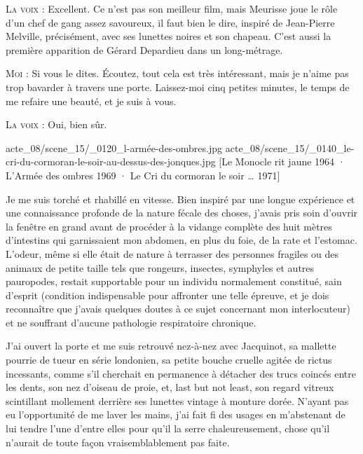 \begin{dialogue}
\textsc{La voix} : Excellent. Ce n’est pas son meilleur film, mais Meurisse joue le rôle d’un chef de gang assez savoureux, il faut bien le dire, inspiré de Jean-Pierre Melville, précisément, avec ses lunettes noires et son chapeau. C’est aussi la première apparition de Gérard Depardieu dans un long-métrage.

\textsc{Moi} : Si vous le dites. Écoutez, tout cela est très intéressant, mais je n’aime pas trop bavarder à travers une porte. Laissez-moi cinq petites minutes, le temps de me refaire une beauté, et je suis à vous.

\textsc{La voix} : Oui, bien sûr.

\end{dialogue}
    
%
%
%
{acte_08/scene_15/_0120_l-armée-des-ombres.jpg}
{acte_08/scene_15/_0140_le-cri-du-cormoran-le-soir-au-dessus-des-jonques.jpg}
[Le Monocle rit jaune \textup{1964} · L'Armée des ombres \textup{1969} · Le Cri du cormoran le soir … \textup{1971}]

Je me suis torché et rhabillé en vitesse. Bien inspiré par une longue expérience et une connaissance profonde de la nature fécale des choses, j’avais pris soin d’ouvrir la fenêtre en grand avant de procéder à la vidange complète des huit mètres d’intestins qui garnissaient mon abdomen, en plus du foie, de la rate et l’estomac. L’odeur, même si elle était de nature à terrasser des personnes fragiles ou des animaux de petite taille tels que rongeurs, insectes, symphyles et autres pauropodes, restait supportable pour un individu normalement constitué, sain d’esprit (condition indispensable pour affronter une telle épreuve, et je dois reconnaître que j’avais quelques doutes à ce sujet concernant mon interlocuteur) et ne souffrant d’aucune pathologie respiratoire chronique.

J’ai ouvert la porte et me suis retrouvé nez-à-nez avec Jacquinot, sa mallette pourrie de tueur en série londonien, sa petite bouche cruelle agitée de rictus incessants, comme s’il cherchait en permanence à détacher des trucs coincés entre les dents, son nez d’oiseau de proie, et, last but not least, son regard vitreux scintillant mollement derrière ses lunettes vintage à monture dorée. N’ayant pas eu l’opportunité de me laver les mains, j’ai fait fi des usages en m’abstenant de lui tendre l’une d’entre elles pour qu’il la serre chaleureusement, chose qu’il n’aurait de toute façon vraisemblablement pas faite.

